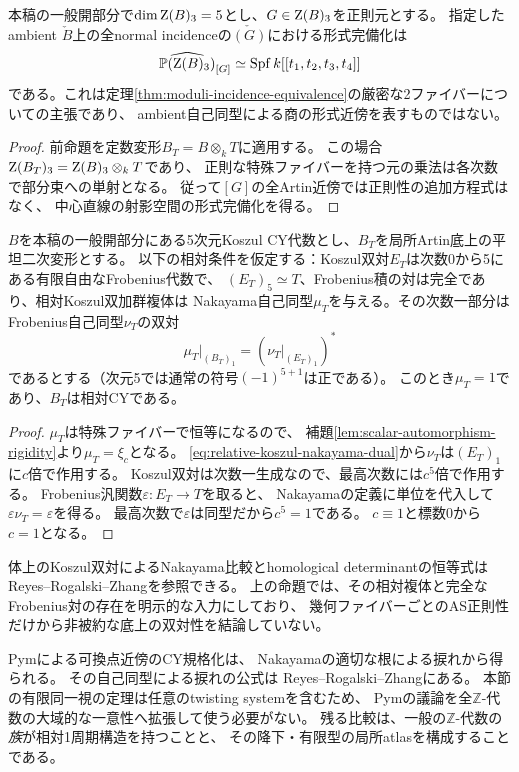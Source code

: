 \begin{corollary}[固定ambient上の全ファイバーの四次元形式近傍]
\label{cor:indexed-normal-four-dimensional-fibre}
本稿の一般開部分で$\dim\operatorname{Z}(B)_3=5$とし、$G\in\operatorname{Z}(B)_3$を正則元とする。
指定したambient $\check B$上の全normal incidenceの$\check{(G)}$における形式完備化は
\[
 \widehat{\mathbb P(\operatorname{Z}(B)_3)}_{[G]}
 \simeq\operatorname{Spf}k[[t_1,t_2,t_3,t_4]]
\]
である。これは定理\ref{thm:moduli-incidence-equivalence}の厳密な2ファイバーについての主張であり、
ambient自己同型による商の形式近傍を表すものではない。
\end{corollary}
\begin{proof}
前命題を定数変形$B_T=B\otimes_kT$に適用する。
この場合$\operatorname{Z}(B_T)_3=\operatorname{Z}(B)_3\otimes_kT$であり、
正則な特殊ファイバーを持つ元の乗法は各次数で部分束への単射となる。
従って$[G]$の全Artin近傍では正則性の追加方程式はなく、
中心直線の射影空間の形式完備化を得る。
\end{proof}

\begin{proposition}
\label{prop:relative-nakayama-rigidity}
$B$を本稿の一般開部分にある5次元Koszul CY代数とし、$B_T$を局所Artin底上の平坦二次変形とする。
以下の相対条件を仮定する：Koszul双対$E_T$は次数0から5にある有限自由なFrobenius代数で、
$(E_T)_5\simeq T$、Frobenius積の対は完全であり、相対Koszul双加群複体は
Nakayama自己同型$\mu_T$を与える。その次数一部分はFrobenius自己同型$\nu_T$の双対
\begin{equation}\label{eq:relative-koszul-nakayama-dual}
 \mu_T|_{(B_T)_1}=(\nu_T|_{(E_T)_1})^*
\end{equation}
であるとする（次元5では通常の符号$(-1)^{5+1}$は正である）。
このとき$\mu_T=1$であり、$B_T$は相対CYである。
\end{proposition}
\begin{proof}
$\mu_T$は特殊ファイバーで恒等になるので、
補題\ref{lem:scalar-automorphism-rigidity}より$\mu_T=\xi_c$となる。
\eqref{eq:relative-koszul-nakayama-dual}から$\nu_T$は$(E_T)_1$に$c$倍で作用する。
Koszul双対は次数一生成なので、最高次数には$c^5$倍で作用する。
Frobenius汎関数$\varepsilon:E_T\to T$を取ると、
Nakayamaの定義に単位を代入して$\varepsilon\nu_T=\varepsilon$を得る。
最高次数で$\varepsilon$は同型だから$c^5=1$である。
$c\equiv1$と標数0から$c=1$となる。
\end{proof}

体上のKoszul双対によるNakayama比較とhomological determinantの恒等式は
Reyes--Rogalski--Zhang\cite[Theorem~6.3 and its proof]{RRZHomological}を参照できる。
上の命題では、その相対複体と完全なFrobenius対の存在を明示的な入力にしており、
幾何ファイバーごとのAS正則性だけから非被約な底上の双対性を結論していない。

Pym\cite[\S2.2, Definition~2.8]{Pym}による可換点近傍のCY規格化は、
Nakayamaの適切な根による捩れから得られる。
その自己同型による捩れの公式は
Reyes--Rogalski--Zhang\cite[Theorem~0.3]{RRZHomological}にある。
本節の有限同一視の定理は任意のtwisting systemを含むため、
Pymの議論を全$\mathbb Z$-代数の大域的な一意性へ拡張して使う必要がない。
残る比較は、一般の$\mathbb Z$-代数の\emph{族}が相対1周期構造を持つことと、
その降下・有限型の局所atlasを構成することである。

